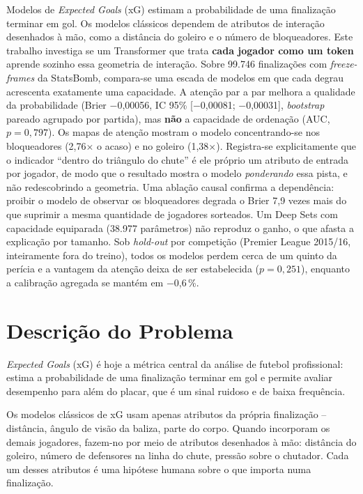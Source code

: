 \documentclass[12pt]{article}
\begin{document}
\begin{resumo}
Modelos de \emph{Expected Goals} (xG) estimam a probabilidade de uma finalização
terminar em gol. Os modelos clássicos dependem de atributos de interação
desenhados à mão, como a distância do goleiro e o número de bloqueadores. Este
trabalho investiga se um Transformer que trata \textbf{cada jogador como um
token} aprende sozinho essa geometria de interação. Sobre 99.746 finalizações com
\emph{freeze-frames} da StatsBomb, compara-se uma escada de modelos em que cada
degrau acrescenta exatamente uma capacidade. A atenção par a par melhora a
qualidade da probabilidade (Brier $-$0,00056, IC 95\% [$-$0,00081; $-$0,00031],
\emph{bootstrap} pareado agrupado por partida), mas \textbf{não} a capacidade de
ordenação (AUC, $p = 0{,}797$). Os mapas de atenção mostram o modelo
concentrando-se nos bloqueadores (2,76$\times$ o acaso) e no goleiro
(1,38$\times$). Registra-se explicitamente que o indicador ``dentro do triângulo
do chute'' é ele próprio um atributo de entrada por jogador, de modo que o
resultado mostra o modelo \emph{ponderando} essa pista, e não redescobrindo a
geometria. Uma ablação causal confirma a dependência: proibir o modelo de
observar os bloqueadores degrada o Brier 7,9 vezes mais do que suprimir a mesma
quantidade de jogadores sorteados. Um Deep Sets com capacidade equiparada
(38.977 parâmetros) não reproduz o ganho, o que afasta a explicação por
tamanho. Sob \emph{hold-out} por competição (Premier League 2015/16,
inteiramente fora do treino), todos os modelos perdem cerca de um quinto da
perícia e a vantagem da atenção deixa de ser estabelecida ($p = 0{,}251$),
enquanto a calibração agregada se mantém em $-$0,6\,\%.
\end{resumo}

\section{Descrição do Problema}

\emph{Expected Goals} (xG) é hoje a métrica central da análise de futebol
profissional: estima a probabilidade de uma finalização terminar em gol e
permite avaliar desempenho para além do placar, que é um sinal ruidoso e de
baixa frequência.

Os modelos clássicos de xG usam apenas atributos da própria finalização --
distância, ângulo de visão da baliza, parte do corpo. Quando incorporam os
demais jogadores, fazem-no por meio de atributos desenhados à mão: distância do
goleiro, número de defensores na linha do chute, pressão sobre o chutador. Cada
um desses atributos é uma hipótese humana sobre o que importa numa finalização.
\end{document}
